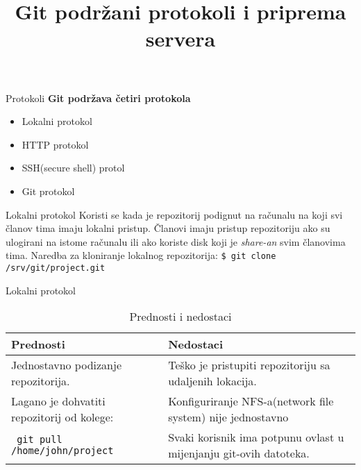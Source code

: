 \documentclass[10pt]{beamer}
\title{Git podržani protokoli i priprema servera}
\begin{document}
	\begin{frame}
		\maketitle	

	\end{frame}
	
	\begin{frame}{\centering Protokoli}
		\textbf{Git podržava četiri protokola}
		\begin{itemize}
			\item Lokalni protokol
			\item HTTP protokol
			\item SSH(secure shell) protol
			\item Git protokol
		\end{itemize}
	
	\end{frame}

	\begin{frame}[fragile]{Lokalni protokol}
		Koristi se kada je repozitorij podignut na računalu na koji svi članov tima imaju lokalni pristup.
		Članovi imaju pristup repozitoriju ako su ulogirani na istome računalu ili ako koriste disk koji je \textit{share-an} svim članovima tima.
		\newline \newline
		Naredba za kloniranje lokalnog repozitorija: \verb|$ git clone /srv/git/project.git|
		
	\end{frame}

	\begin{frame}{Lokalni protokol}
		\begin{table}
			\caption{Prednosti i nedostaci}
			\begin{tabular}{||p{130pt}|p{130pt}||}
				\hline
				\textbf{Prednosti} & \textbf{Nedostaci} \\ \hline
				Jednostavno podizanje repozitorija. & Teško je pristupiti repozitoriju 	sa udaljenih lokacija. \\
				Lagano je dohvatiti repozitorij od kolege: & Konfiguriranje NFS-a(network file system) nije jednostavno\\ \texttt{ git pull /home/john/project}  & Svaki korisnik ima potpunu ovlast u mijenjanju git-ovih datoteka. \\
				\hline
			\end{tabular}
		\end{table}

	\end{frame}
\end{document}
